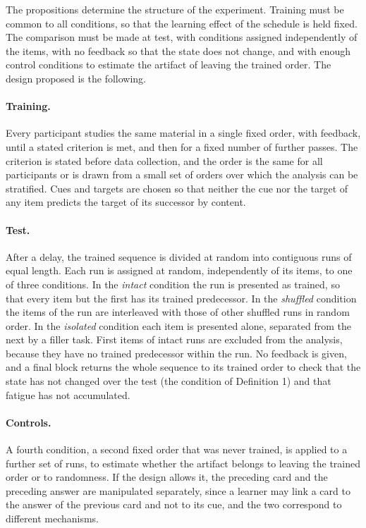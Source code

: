 \documentclass[11pt]{article}
\theoremstyle{remark}
\begin{document}
The propositions determine the structure of the experiment. Training must be common to all conditions, so that the learning effect of the schedule is held fixed. The comparison must be made at test, with conditions assigned independently of the items, with no feedback so that the state does not change, and with enough control conditions to estimate the artifact of leaving the trained order. The design proposed is the following.

\paragraph{Training.} Every participant studies the same material in a single fixed order, with feedback, until a stated criterion is met, and then for a fixed number of further passes. The criterion is stated before data collection, and the order is the same for all participants or is drawn from a small set of orders over which the analysis can be stratified. Cues and targets are chosen so that neither the cue nor the target of any item predicts the target of its successor by content.

\paragraph{Test.} After a delay, the trained sequence is divided at random into contiguous runs of equal length. Each run is assigned at random, independently of its items, to one of three conditions. In the \emph{intact} condition the run is presented as trained, so that every item but the first has its trained predecessor. In the \emph{shuffled} condition the items of the run are interleaved with those of other shuffled runs in random order. In the \emph{isolated} condition each item is presented alone, separated from the next by a filler task. First items of intact runs are excluded from the analysis, because they have no trained predecessor within the run. No feedback is given, and a final block returns the whole sequence to its trained order to check that the state has not changed over the test (the condition of Definition 1) and that fatigue has not accumulated.

\paragraph{Controls.} A fourth condition, a second fixed order that was never trained, is applied to a further set of runs, to estimate whether the artifact belongs to leaving the trained order or to randomness. If the design allows it, the preceding card and the preceding answer are manipulated separately, since a learner may link a card to the answer of the previous card and not to its cue, and the two correspond to different mechanisms.
\end{document}
